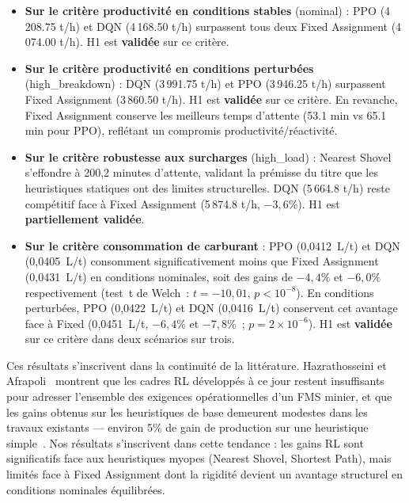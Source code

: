\documentclass[11pt,a4paper]{report}
\begin{document}
\begin{itemize}
    \item \textbf{Sur le critère productivité en conditions stables} (nominal) : PPO (4\,208.75 t/h) et DQN (4\,168.50 t/h) surpassent tous deux Fixed Assignment (4\,074.00 t/h). H1 est \textbf{validée} sur ce critère.

    \item \textbf{Sur le critère productivité en conditions perturbées} (high\_breakdown) : DQN (3\,991.75 t/h) et PPO (3\,946.25 t/h) surpassent Fixed Assignment (3\,860.50 t/h). H1 est \textbf{validée} sur ce critère. En revanche, Fixed Assignment conserve les meilleurs temps d'attente (53.1 min vs 65.1 min pour PPO), reflétant un compromis productivité/réactivité.

    \item \textbf{Sur le critère robustesse aux surcharges} (high\_load) : Nearest Shovel s'effondre à 200,2 minutes d'attente, validant la prémisse du titre que les heuristiques statiques ont des limites structurelles. DQN (5\,664.8 t/h) reste compétitif face à Fixed Assignment (5\,874.8 t/h, $-3{,}6\%$). H1 est \textbf{partiellement validée}.

    \item \textbf{Sur le critère consommation de carburant} : PPO
    (0{,}0412~L/t) et DQN (0{,}0405~L/t) consomment significativement
    moins que Fixed Assignment (0{,}0431~L/t) en conditions nominales,
    soit des gains de $-4{,}4\%$ et $-6{,}0\%$ respectivement
    (test~t de Welch~: $t = -10{,}01$, $p < 10^{-8}$).
    En conditions perturbées, PPO (0{,}0422~L/t) et DQN (0{,}0416~L/t)
    conservent cet avantage face à Fixed (0{,}0451~L/t, $-6{,}4\%$ et
    $-7{,}8\%$~; $p = 2 \times 10^{-6}$).
    H1 est \textbf{validée} sur ce critère dans deux scénarios sur trois.
\end{itemize}

Ces résultats s'inscrivent dans la continuité de la littérature.
Hazrathosseini et Afrapoli~\cite{HazrathosseiniAfrapoli2024} montrent que les cadres RL développés à ce jour restent insuffisants pour adresser l'ensemble des exigences opérationnelles d'un FMS minier, et que les gains obtenus sur les heuristiques de base demeurent modestes dans les travaux existants --- environ 5\% de gain de production sur une heuristique simple~\cite{HazrathosseiniAfrapoli2024}. Nos résultats s'inscrivent dans cette tendance : les gains RL sont significatifs face aux heuristiques myopes (Nearest Shovel, Shortest Path), mais limités face à Fixed Assignment dont la rigidité devient un avantage structurel en conditions nominales équilibrées.
\end{document}
